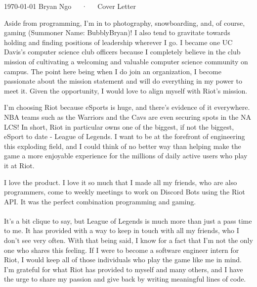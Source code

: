 \documentclass[11pt, a4paper]{awesome-cv}
\begin{document}
\makecvheader[R]

\makecvfooter
  {\today}
  {Bryan Ngo~~~·~~~Cover Letter}
  {}

\makelettertitle

\begin{cvletter}

Aside from programming, I'm in to photography, snowboarding, and, of course, gaming (Summoner Name: BubblyBryan)! I also tend to gravitate towards holding and finding positions of leadership wherever I go. I became one UC Davis's computer science club officers because I completely believe in the club mission of cultivating a welcoming and valuable computer science community on campus. The point here being when I do join an organization, I become passionate about the mission statement and will do everything in my power to meet it. Given the opportunity, I would love to align myself with Riot's mission.

I'm choosing Riot because eSports is huge, and there's evidence of it everywhere. NBA teams such as the Warriors and the Cavs are even securing spots in the NA LCS! In short, Riot in particular owns one of the biggest, if not the biggest, eSport to date - League of Legends. I want to be at the forefront of engineering this exploding field, and I could think of no better way than helping make the game a more enjoyable experience for the millions of daily active users who play it at Riot.

I love the product. I love it so much that I made all my friends, who are also programmers, come to weekly meetings to work on Discord Bots using the Riot API. It was the perfect combination programming and gaming. \\ \\
It's a bit clique to say, but League of Legends is much more than just a pass time to me. It has provided with a way to keep in touch with all my friends, who I don't see very often. With that being said, I know for a fact that I'm not the only one who shares this feeling. If I were to become a software engineer intern for Riot, I would keep all of those individuals who play the game like me in mind. I'm grateful for what Riot has provided to myself and many others, and I have the urge to share my passion and give back by writing meaningful lines of code.

\end{cvletter}


\makeletterclosing
\end{document}
